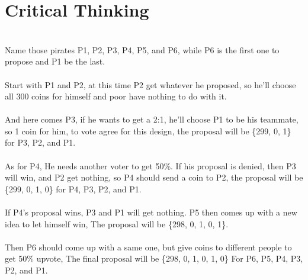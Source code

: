 \documentclass{article}
\begin{document}
\section{Critical Thinking}
\\Name those pirates P1, P2, P3, P4, P5, and P6, while P6 is the first one to propose and P1 be the last.
\\\\Start with P1 and P2, at this time P2 get whatever he proposed, so he'll choose all 300 coins for himself and poor have nothing to do with it.
\\\\And here comes P3, if he wants to get a 2:1, he'll choose P1 to be his teammate, so 1 coin for him, to vote agree for this design, the proposal will be \{299, 0, 1\} for P3, P2, and P1.
\\\\As for P4, He needs another voter to get 50\%. If his proposal is denied, then P3 will win, and P2 get nothing, so P4 should send a coin to P2, the proposal will be \{299, 0, 1, 0\} for P4, P3, P2, and P1.
\\\\If P4's proposal wins, P3 and P1 will get nothing. P5 then comes up with a new idea to let himself win, The proposal will be \{298, 0, 1, 0, 1\}.
\\\\Then P6 should come up with a same one, but give coins to different people to get 50\% upvote, The final proposal will be \{298, 0, 1, 0, 1, 0\} For P6, P5, P4, P3, P2, and P1.
\end{document}
